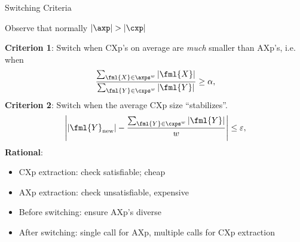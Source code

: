 \begin{frame}{Switching Criteria}
	\small 

	Observe that normally $|\axp| > |\cxp|$
	
	\textbf{Criterion 1}:
	Switch when CXp's on average are \emph{much} smaller than AXp's, i.e. when
	\begin{align}
	    \frac{\sum_{\fml{X}\in\axps^w}{|\fml{X}|}}{\sum_{\fml{Y}\in\cxps^w}{|\fml{Y}|}} \geq \alpha,
	\end{align}
	\textbf{Criterion 2}:
	Switch when the average CXp size ``stabilizes''.
	\begin{align}
	    \left|\left|\fml{Y}_{\text{new}}\right|-\frac{\sum_{\fml{Y}\in\cxps^w}{|\fml{Y}|}}{w}\right| \leq \varepsilon,
	\end{align}
	\textbf{Rational}: 
	\begin{itemize}
		\item CXp extraction: check satisfiable; cheap 
		\item AXp extraction: check unsatisfiable, expensive
		\item Before switching: ensure AXp's diverse
		\item After switching: single call for AXp, multiple calls for CXp extraction
	\end{itemize}

\end{frame}

